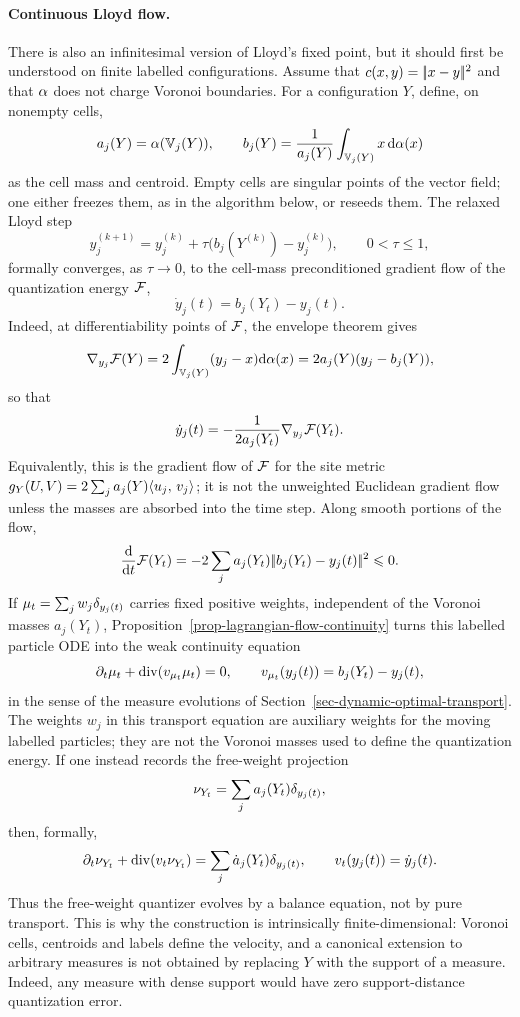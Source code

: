 \paragraph{Continuous Lloyd flow.}
There is also an infinitesimal version of Lloyd's fixed point, but it should first be understood on finite labelled configurations. Assume that \(c(x,y)=|\!| x-y |\!|^2\) and that \(\alpha\) does not charge Voronoi boundaries. For a configuration \(Y\), define, on nonempty cells,
\[
	a_j(Y)=\alpha(\mathbb{V}_j(Y)),
	\qquad
	b_j(Y)=\frac{1}{a_j(Y)}\int_{\mathbb{V}_j(Y)}x\,\mathrm{d}\alpha(x)
\]
as the cell mass and centroid. Empty cells are singular points of the vector field; one either freezes them, as in the algorithm below, or reseeds them. The relaxed Lloyd step
\[
	y_j^{(k+1)}=y_j^{(k)}+\tau\big(b_j(Y^{(k)})-y_j^{(k)}\big),
	\qquad 0<\tau\leq 1,
\]
formally converges, as \(\tau\to0\), to the cell-mass preconditioned gradient flow of the quantization energy \(\mathcal{F}\),
\[
	\dot y_j(t)=b_j(Y_t)-y_j(t).
\]
Indeed, at differentiability points of \(\mathcal{F}\), the envelope theorem gives
\[
	\nabla_{y_j}\mathcal{F}(Y)
	=
	2\int_{\mathbb{V}_j(Y)}(y_j-x)\mathrm{d}\alpha(x)
	=
	2a_j(Y)(y_j-b_j(Y)),
\]
so that
\[
	\dot y_j(t)
	=
	-\frac{1}{2a_j(Y_t)}\nabla_{y_j}\mathcal{F}(Y_t).
\]
Equivalently, this is the gradient flow of \(\mathcal{F}\) for the site metric \(g_Y(U,V)=2\sum_j a_j(Y)\langle u_j,\,v_j\rangle\); it is not the unweighted Euclidean gradient flow unless the masses are absorbed into the time step. Along smooth portions of the flow,
\[
	\frac{\mathrm{d}}{\mathrm{d} t}\mathcal{F}(Y_t)
	=
	-2\sum_j a_j(Y_t)|\!| b_j(Y_t)-y_j(t) |\!|^2
	\leqslant 0.
\]
If \(\mu_t=\sum_j w_j\delta_{y_j(t)}\) carries fixed positive weights, independent of the Voronoi masses \(a_j(Y_t)\), Proposition~\ref{prop-lagrangian-flow-continuity} turns this labelled particle ODE into the weak continuity equation
\[
	\partial_t\mu_t+\operatorname{div}(v_{\mu_t}\mu_t)=0,
	\qquad
	v_{\mu_t}(y_j(t))=b_j(Y_t)-y_j(t),
\]
in the sense of the measure evolutions of Section~\ref{sec-dynamic-optimal-transport}. The weights \(w_j\) in this transport equation are auxiliary weights for the moving labelled particles; they are not the Voronoi masses used to define the quantization energy. If one instead records the free-weight projection
\[
	\nu_{Y_t}=\sum_j a_j(Y_t)\delta_{y_j(t)},
\]
then, formally,
\[
	\partial_t\nu_{Y_t}+\operatorname{div}(v_t\nu_{Y_t})
	=
	\sum_j \dot a_j(Y_t)\delta_{y_j(t)},
	\qquad
	v_t(y_j(t))=\dot y_j(t).
\]
Thus the free-weight quantizer evolves by a balance equation, not by pure transport. This is why the construction is intrinsically finite-dimensional: Voronoi cells, centroids and labels define the velocity, and a canonical extension to arbitrary measures is not obtained by replacing \(Y\) with the support of a measure. Indeed, any measure with dense support would have zero support-distance quantization error.

